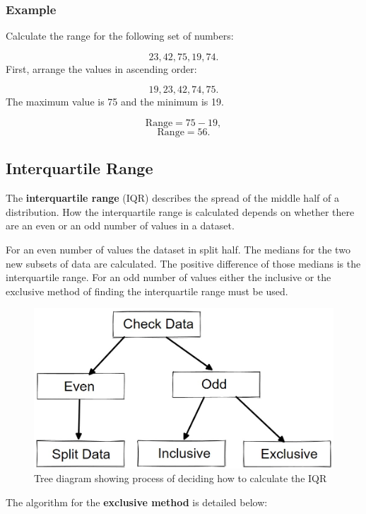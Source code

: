 \documentclass[
]{book}
\begin{document}
\hypertarget{example-7}{%
\subsubsection{Example}\label{example-7}}

Calculate the range for the following set of numbers:

\[ 23, 42, 75, 19, 74. \]
First, arrange the values in ascending order:

\[ 19, 23, 42, 74, 75. \]
The maximum value is 75 and the minimum is 19.

\[ \textrm{Range}= 75 - 19, \]
\[ \textrm{Range} = 56.\]

\hypertarget{interquartile-range}{%
\subsection{Interquartile Range}\label{interquartile-range}}

The \textbf{interquartile range} (IQR) describes the spread of the middle half of a distribution. How the interquartile range is calculated depends on whether there are an even or an odd number of values in a dataset.

For an even number of values the dataset in split half. The medians for the two new subsets of data are calculated. The positive difference of those medians is the interquartile range.
For an odd number of values either the inclusive or the exclusive method of finding the interquartile range must be used.

\begin{figure}
\centering
\includegraphics{iqrtree.jpg}
\caption{Tree diagram showing process of deciding how to calculate the IQR}
\end{figure}

The algorithm for the \textbf{exclusive method} is detailed below:
\end{document}
